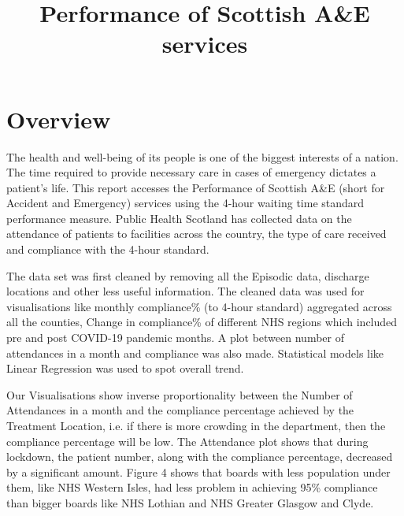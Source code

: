 \documentclass[11pt,a4paper]{article}
\title{Performance of Scottish A\&E services}
\begin{document}
\maketitle

\section{Overview}
The health and well-being of its people is one of the biggest interests of a nation. The time required to provide necessary care in cases of emergency dictates a patient's life. This report accesses the Performance of Scottish A\&E (short for Accident and Emergency) services using the 4-hour waiting time standard performance measure. Public Health Scotland has collected data on the attendance of patients to facilities across the country, the type of care received and compliance with the 4-hour standard.

The data set was first cleaned by removing all the Episodic data, discharge locations and other less useful information. The cleaned data was used for visualisations like monthly compliance\% (to 4-hour standard) aggregated across all the counties, Change in compliance\% of different NHS regions which included pre and post COVID-19 pandemic months. A plot between number of attendances in a month and compliance was also made. Statistical models like Linear Regression was used to spot overall trend.

Our Visualisations show inverse proportionality between the Number of Attendances in a month and the compliance percentage achieved by the Treatment Location, i.e. if there is more crowding in the department, then the compliance percentage will be low. The Attendance plot shows that during lockdown, the patient number, along with the compliance percentage, decreased by a significant amount. Figure 4 shows that boards with less population under them, like NHS Western Isles, had less problem in achieving 95\% compliance than bigger boards like NHS Lothian and NHS Greater Glasgow and Clyde.


\end{document}
